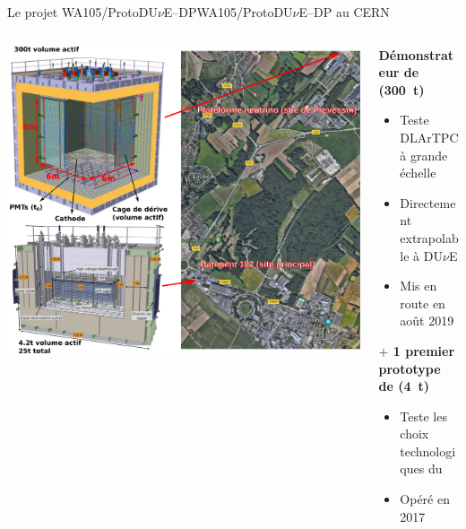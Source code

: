     \begin{frame}{Le projet WA105/ProtoDU$\nu$E--DP}{WA105/\texorpdfstring{ProtoDU$\nu$E}{ProtoDUNE}--DP au CERN}
        \begin{scriptsize}
            \begin{columns}
                \begin{column}{0.75\textwidth}
                    \centering
                    \includegraphics[width=\textwidth]{./pictures/wa105.png}
                \end{column}
                \begin{column}{0.25\textwidth}
                    \textbf{Démonstrateur de \SSS{} (\SI{300}{\tonne})}\\
                    \begin{itemize}
                        \item Teste DLArTPC à grande échelle
                        \item Directement extrapolable à DU$\nu$E
                        \item Mis en route en août 2019
                    \end{itemize}
                    \vspace{1cm}
                    \textbf{$+$ 1 premier prototype de \TOO{} (\SI{4}{\tonne})}\\
                    \begin{itemize}
                        \item Teste les  choix technologiques du \SSS{}
                        \item Opéré en 2017
                    \end{itemize}
                \end{column}
            \end{columns}
        \end{scriptsize}
    \end{frame}

